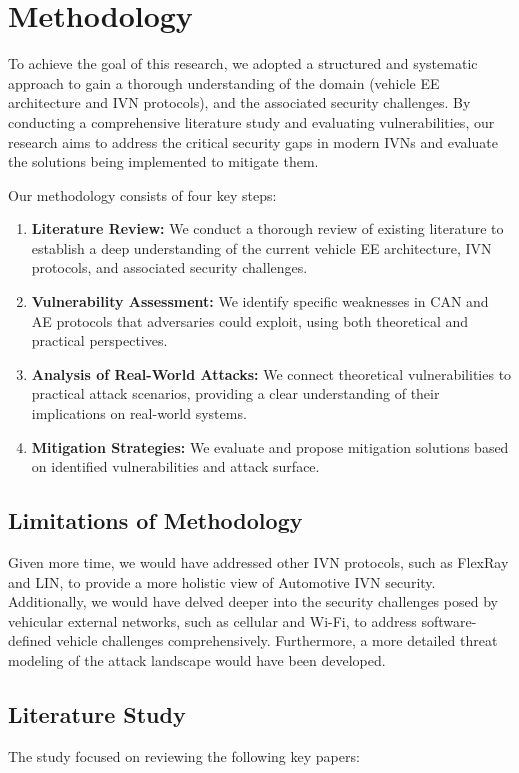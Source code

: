 \documentclass{report}
\begin{document}
\section{Methodology}
To achieve the goal of this research, we adopted a structured and systematic approach to gain a thorough understanding of the domain (vehicle EE architecture and IVN protocols), and the associated security challenges. By conducting a comprehensive literature study and evaluating vulnerabilities,  our research aims to address the critical security gaps in modern IVNs and evaluate the solutions being implemented to mitigate them.

Our methodology consists of four key steps:

\begin{enumerate}
    \item \textbf{Literature Review:} We conduct a thorough review of existing literature to establish a deep understanding of the current vehicle EE architecture, IVN protocols, and associated security challenges.
    \item \textbf{Vulnerability Assessment:} We identify specific weaknesses in CAN and AE protocols that adversaries could exploit, using both theoretical and practical perspectives.
    \item \textbf{Analysis of Real-World Attacks:} We connect theoretical vulnerabilities to practical attack scenarios, providing a clear understanding of their implications on real-world systems.
    \item \textbf{Mitigation Strategies:} We evaluate and propose mitigation solutions based on identified vulnerabilities and attack surface.
\end{enumerate}

\subsection{Limitations of Methodology}
Given more time, we would have addressed other IVN protocols, such as FlexRay and LIN, to provide a more holistic view of Automotive IVN security. Additionally, we would have delved deeper into the security challenges posed by vehicular external networks, such as cellular and Wi-Fi, to address software-defined vehicle challenges comprehensively. Furthermore, a more detailed threat modeling of the attack landscape would have been developed.


\subsection{Literature Study}
The study focused on reviewing the following key papers:
\end{document}

